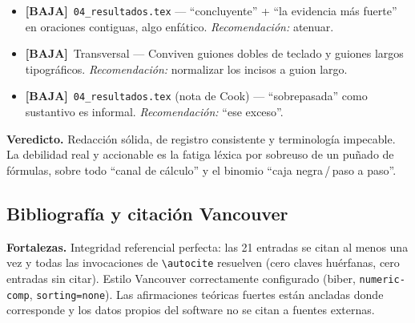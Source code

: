 \documentclass[11pt,a4paper]{article}
\newcommand{\sevbaja}{\textcolor{cBaja}{\textbf{[BAJA]}}}
\newcommand{\fileref}[1]{\texttt{\small #1}}
\begin{document}
\begin{itemize}
  \item \sevbaja\ \fileref{04\_resultados.tex} — ``concluyente'' + ``la evidencia más fuerte'' en oraciones contiguas, algo enfático. \textit{Recomendación:} atenuar.
  \item \sevbaja\ Transversal — Conviven guiones dobles de teclado y guiones largos tipográficos. \textit{Recomendación:} normalizar los incisos a guion largo.
  \item \sevbaja\ \fileref{04\_resultados.tex} (nota de Cook) — ``sobrepasada'' como sustantivo es informal. \textit{Recomendación:} ``ese exceso''.
\end{itemize}

\textbf{Veredicto.} Redacción sólida, de registro consistente y terminología impecable. La debilidad
real y accionable es la fatiga léxica por sobreuso de un puñado de fórmulas, sobre todo ``canal de
cálculo'' y el binomio ``caja negra\,/\,paso a paso''.

\subsection{Bibliografía y citación Vancouver}

\textbf{Fortalezas.} Integridad referencial perfecta: las 21 entradas se citan al menos una vez y todas
las invocaciones de \texttt{\textbackslash autocite} resuelven (cero claves huérfanas, cero entradas sin citar).
Estilo Vancouver correctamente configurado (biber, \texttt{numeric-comp}, \texttt{sorting=none}). Las
afirmaciones teóricas fuertes están ancladas donde corresponde y los datos propios del software no se
citan a fuentes externas.
\end{document}
